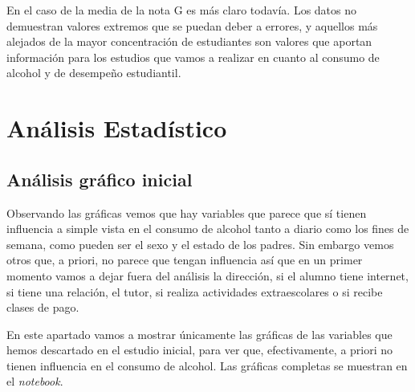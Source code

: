 \documentclass[12pt,a4paper]{article}
\begin{document}
En el caso de la media de la nota G es más claro todavía. Los datos no demuestran valores extremos que se puedan deber a errores, y aquellos más alejados de la mayor concentración de estudiantes son valores que aportan información para los estudios que vamos a realizar en cuanto al consumo de alcohol y de desempeño estudiantil.


\section{Análisis Estadístico}
\subsection{Análisis gráfico inicial}
Observando las gráficas vemos que hay variables que parece que sí tienen influencia a simple vista en el consumo de alcohol tanto a diario como los fines de semana, como pueden ser el sexo y el estado de los padres. Sin embargo vemos otros que, a priori, no parece que tengan influencia así que en un primer momento vamos a dejar fuera del análisis la dirección, si el alumno tiene internet, si tiene una relación, el tutor, si realiza actividades extraescolares o si recibe clases de pago. 


En este apartado vamos a mostrar únicamente las gráficas de las variables que hemos descartado en el estudio inicial, para ver que, efectivamente, a priori no tienen influencia en el consumo de alcohol. Las gráficas completas se muestran en el \textit{notebook}. 
\end{document}
